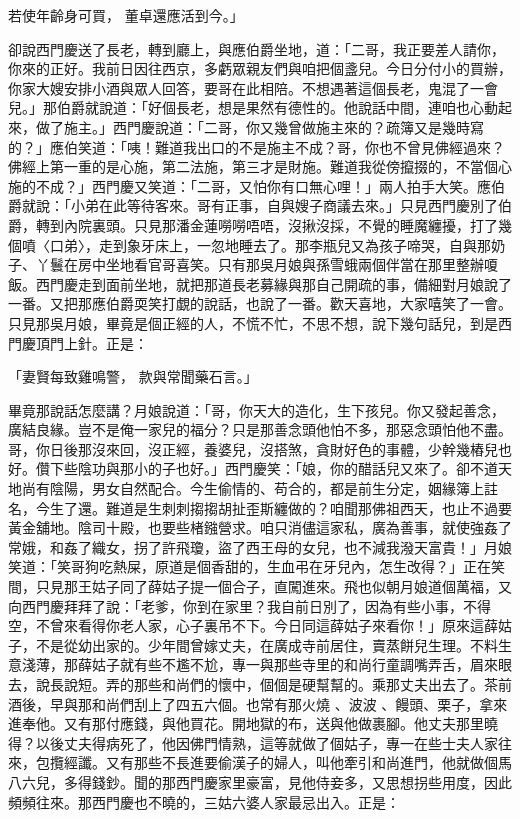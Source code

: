 \begin{showcontents}{}
若使年齡身可買，  董卓還應活到今。」

卻說西門慶送了長老，轉到廳上，與應伯爵坐地，道：「二哥，我正要差人請你，你來的正好。我前日因往西京，多虧眾親友們與咱把個盞兒。今日分付小的買辦，你家大嫂安排小酒與眾人回答，要哥在此相陪。不想遇著這個長老，鬼混了一會兒。」那伯爵就說道：「好個長老，想是果然有德性的。他說話中間，連咱也心動起來，做了施主。」西門慶說道：「二哥，你又幾曾做施主來的？疏簿又是幾時寫的？」應伯笑道：「咦！難道我出口的不是施主不成？哥，你也不曾見佛經過來？佛經上第一重的是心施，第二法施，第三才是財施。難道我從傍攛掇的，不當個心施的不成？」西門慶又笑道：「二哥，又怕你有口無心哩！」兩人拍手大笑。應伯爵就說：「小弟在此等待客來。哥有正事，自與嫂子商議去來。」只見西門慶別了伯爵，轉到內院裏頭。只見那潘金蓮嘮嘮唔唔，沒揪沒採，不覺的睡魔纏擾，打了幾個噴〈口弟〉，走到象牙床上，一忽地睡去了。那李瓶兒又為孩子啼哭，自與那奶子、丫鬟在房中坐地看官哥喜笑。只有那吳月娘與孫雪蛾兩個伴當在那里整辦嗄飯。西門慶走到面前坐地，就把那道長老募緣與那自己開疏的事，備細對月娘說了一番。又把那應伯爵耎笑打覷的說話，也說了一番。歡天喜地，大家嘻笑了一會。只見那吳月娘，畢竟是個正經的人，不慌不忙，不思不想，說下幾句話兒，到是西門慶頂門上針。正是：

「妻賢每致雞鳴警，  款與常聞藥石言。」

畢竟那說話怎麼講？月娘說道：「哥，你天大的造化，生下孩兒。你又發起善念，廣結良緣。豈不是俺一家兒的福分？只是那善念頭他怕不多，那惡念頭怕他不盡。哥，你日後那沒來回，沒正經，養婆兒，沒搭煞，貪財好色的事體，少幹幾樁兒也好。儹下些陰功與那小的子也好。」西門慶笑：「娘，你的醋話兒又來了。卻不道天地尚有陰陽，男女自然配合。今生偷情的、苟合的，都是前生分定，姻緣簿上註名，今生了還。難道是生刺刺搊搊胡扯歪斯纏做的？咱聞那佛祖西天，也止不過要黃金舖地。陰司十殿，也要些楮鏹營求。咱只消儘這家私，廣為善事，就使強姦了常娥，和姦了織女，拐了許飛瓊，盜了西王母的女兒，也不減我潑天富貴！」月娘笑道：「笑哥狗吃熱屎，原道是個香甜的，生血弔在牙兒內，怎生改得？」正在笑間，只見那王姑子同了薛姑子提一個合子，直闖進來。飛也似朝月娘道個萬福，又向西門慶拜拜了說：「老爹，你到在家里？我自前日別了，因為有些小事，不得空，不曾來看得你老人家，心子裏吊不下。今日同這薛姑子來看你！」原來這薛姑子，不是從幼出家的。少年間曾嫁丈夫，在廣成寺前居住，賣蒸餅兒生理。不料生意淺薄，那薛姑子就有些不尷不尬，專一與那些寺里的和尚行童調嘴弄舌，眉來眼去，說長說短。弄的那些和尚們的懷中，個個是硬幫幫的。乘那丈夫出去了。茶前酒後，早與那和尚們刮上了四五六個。也常有那火燒 、波波 、饅頭、栗子，拿來進奉他。又有那付應錢，與他買花。開地獄的布，送與他做裹腳。他丈夫那里曉得？以後丈夫得病死了，他因佛門情熟，這等就做了個姑子，專一在些士夫人家往來，包攬經讖。又有那些不長進要偷漢子的婦人，叫他牽引和尚進門，他就做個馬八六兒，多得錢鈔。聞的那西門慶家里豪富，見他侍妾多，又思想拐些用度，因此頻頻往來。那西門慶也不曉的，三姑六婆人家最忌出入。正是：


\end{showcontents}
